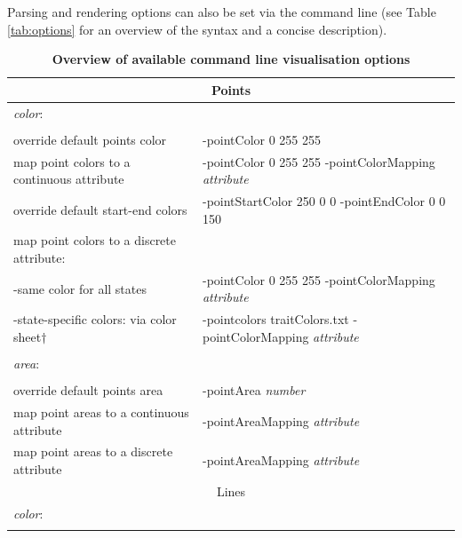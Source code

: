 \documentclass[english]{paper}
\begin{document}
\vspace{.5cm}

Parsing and rendering options can also be set via the command line (see Table \ref{tab:options} for an overview of the syntax and a concise description). 

\vspace{0.5cm}
\begin{table}
\centering
\caption[Overview of available command line visualisation options]{\footnotesize{\textbf{Overview of available command line visualisation options}}}
\begin{tabular}{ll}
\\
\toprule
			\multicolumn{2}{c}{Points}															\\
\midrule	
\textit{color}:						&		
																						\\
								&														\\
override default points color			& -pointColor 0 255 255										\\
map point colors to a continuous attribute 	& -pointColor 0 255 255 -pointColorMapping \textit{attribute}			\\
override default start-end colors		& -pointStartColor 250 0 0 -pointEndColor 0 0 150				\\
map point colors to a discrete attribute:	& 					 									\\
	-same color for all states			&-pointColor 0 255 255 -pointColorMapping \textit{attribute}			\\
	-state-specific colors: via color sheet$\dagger$&-pointcolors traitColors.txt -pointColorMapping \textit{attribute}	\\
								&														\\
\textit{area}: 						&														\\
								&														\\
override default points area			& -pointArea \textit{number}									\\	
map point areas to a continuous attribute	& -pointAreaMapping \textit{attribute}								\\
map point areas to a discrete attribute	& -pointAreaMapping \textit{attribute}								\\
\midrule
			\multicolumn{2}{c}{Lines}															\\
\midrule
\textit{color}:						&														\\
								&														\\

\end{tabular}
\end{table}
\end{document}

